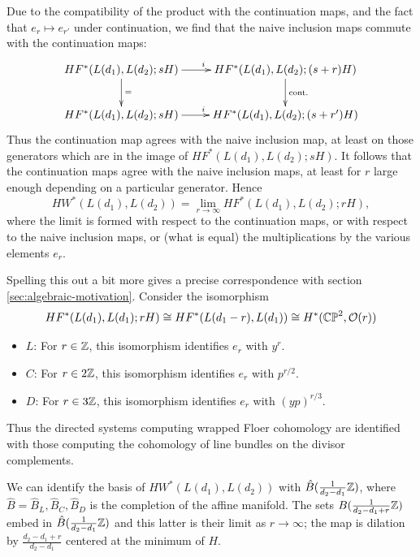 \documentclass[12pt]{amsart}
\begin{document}
Due to the compatibility of the product with the continuation maps,
and the fact that $e_r \mapsto e_{r'}$ under continuation, we find that
the naive inclusion maps commute with the continuation maps:
\begin{equation}
  \xymatrix{
    HF^*(L(d_1),L(d_2);sH)\ar[d]^{=} \ar[r]^{i}& HF^*(L(d_1),L(d_2); (s+r)H)\ar[d]^{\text{cont.}}\\
    HF^*(L(d_1),L(d_2);sH) \ar[r]^{i}& HF^*(L(d_1),L(d_2); (s+r')H)
  }
\end{equation}
Thus the continuation map agrees with the naive inclusion map, at
least on those generators which are in the image of
$HF^*(L(d_1),L(d_2);sH)$. It follows that the continuation maps agree
with the naive inclusion maps, at least for $r$ large enough depending
on a particular generator. Hence
\begin{equation}
  HW^*(L(d_1),L(d_2)) = \lim_{r\to \infty} HF^*(L(d_1),L(d_2);rH),
\end{equation}
where the limit is formed with respect to the continuation maps, or
with respect to the naive inclusion maps, or (what is equal) the
multiplications by the various elements $e_r$.

Spelling this out a bit more gives a precise correspondence with
section \ref{sec:algebraic-motivation}. Consider the isomorphism
\begin{equation}
  HF^*(L(d_1),L(d_1);rH) \cong HF^*(L(d_1-r),L(d_1)) \cong H^*(\mathbb{CP}^2, \mathcal{O}(r))
\end{equation}
\begin{itemize}
\item $L$: For $r \in \mathbb{Z}$, this isomorphism identifies $e_r$ with $y^r$.
\item $C$: For $r \in 2\mathbb{Z}$, this isomorphism identifies $e_r$ with $p^{r/2}$.
\item $D$: For $r \in 3\mathbb{Z}$, this isomorphism identifies $e_r$ with $(yp)^{r/3}$.
\end{itemize}
Thus the directed systems computing wrapped Floer cohomology are
identified with those computing the cohomology of line bundles on the
divisor complements.


We can identify the basis of $HW^*(L(d_1),L(d_2))$ with
$\hat{B}(\frac{1}{d_2-d_1} \mathbb{Z})$, where $\hat{B} =
\hat{B}_L,\hat{B}_C,\hat{B}_D$ is the completion of the affine
manifold. The sets $B(\frac{1}{d_2-d_1+r}\mathbb{Z})$ embed in
$\hat{B}(\frac{1}{d_2-d_1}\mathbb{Z})$ and this latter is their limit as $r
\to \infty$; the map
is dilation by $\frac{d_2-d_1+r}{d_2-d_1}$ centered at the minimum of
$H$.
\end{document}
